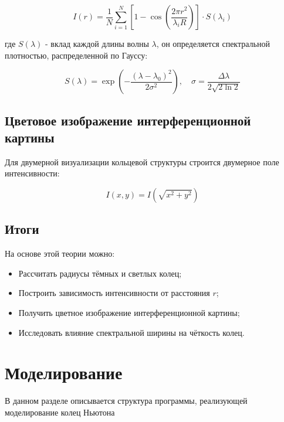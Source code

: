 \documentclass[a4paper,11pt]{article}
\theoremstyle{definition}
\begin{document}
    \begin{equation}
        I(r) = \frac{1}{N} \sum_{i=1}^{N} \left[1 - \cos\left( \frac{2\pi r^2}{\lambda_i R} \right) \right] \cdot S(\lambda_i)\label{eq:equation7}
    \end{equation}

    где \( S(\lambda) \) - вклад каждой длины волны \(\lambda\), он определяется спектральной плотностью,
    распределенной по Гауссу:

    \begin{equation}
        S(\lambda) = \exp\left( -\frac{(\lambda - \lambda_0)^2}{2\sigma^2} \right), \quad \sigma = \frac{\Delta\lambda}{2\sqrt{2 \ln 2}}\label{eq:equation8}
    \end{equation}

    \subsection{Цветовое изображение интерференционной картины}
    Для двумерной визуализации кольцевой структуры строится двумерное поле интенсивности:

    \begin{equation}
        I(x, y) = I\left( \sqrt{x^2 + y^2} \right)\label{eq:equation9}
    \end{equation}

    \subsection{Итоги}
    На основе этой теории можно:
    \begin{itemize}
        \item Рассчитать радиусы тёмных и светлых колец;
        \item Построить зависимость интенсивности от расстояния \( r \);
        \item Получить цветное изображение интерференционной картины;
        \item Исследовать влияние спектральной ширины на чёткость колец.
    \end{itemize}


    \newpage


    \section{Моделирование}

    В данном разделе описывается структура программы, реализующей моделирование колец Ньютона
\end{document}
